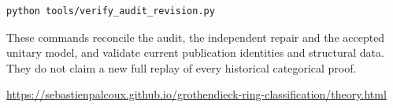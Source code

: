 \documentclass[11pt,a4paper]{article}
\begin{document}
\begin{verbatim}
python tools/verify_audit_revision.py
\end{verbatim}
These commands reconcile the audit, the independent repair and the accepted unitary model, and validate current
publication identities and structural data. They do not claim a new full
replay of every historical categorical proof.

\url{https://sebastienpalcoux.github.io/grothendieck-ring-classification/theory.html}
\end{document}
